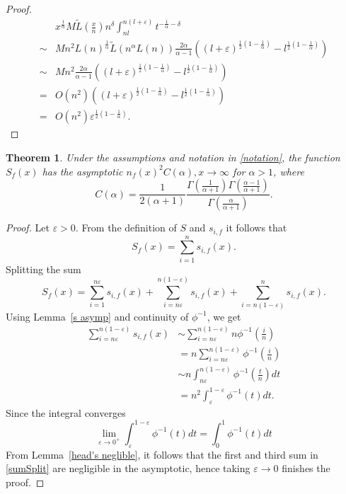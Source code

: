 \documentclass[10pt]{article}
\theoremstyle{plain}
\newtheorem{theorem}{Theorem}
\theoremstyle{definition}
\let\epsilon\varepsilon
\begin{document}
\begin{proof}
\begin{align}
			&x^{\frac{1}{\alpha}}M\tilde{L}\left(\frac{x}{n}\right)n^\delta\int_{nl}^{n(l+\epsilon)} t^{-\frac{1}{\alpha}-\delta}\\
			\sim &Mn^{2}L(n)^{\frac{1}{\alpha}}\tilde{L}(n^\alpha L(n))\frac{2\alpha}{\alpha-1}((l+\epsilon)^{\frac{1}{2}(1-\frac{1}{\alpha})}-l^{\frac{1}{2}(1-\frac{1}{\alpha})})\\
			\sim &Mn^{2}\frac{2\alpha}{\alpha-1}((l+\epsilon)^{\frac{1}{2}(1-\frac{1}{\alpha})}-l^{\frac{1}{2}(1-\frac{1}{\alpha})})\\
			=&O(n^2)((l+\epsilon)^{\frac{1}{2}(1-\frac{1}{\alpha})}-l^{\frac{1}{2}(1-\frac{1}{\alpha})})\\
			=&O(n^2)\epsilon^{\frac{1}{2}(1-\frac{1}{\alpha})}.
		\end{align}	
	\end{proof}
	
	
	
	
	
	
	\begin{theorem}\label{BlockSumsforAlphaGr1}
		Under the assumptions and notation in \ref{notation}, the function $S_f(x)$ has the asymptotic $n_f(x)^2 C(\alpha), x\to\infty$ for $\alpha>1$, where 
		\begin{equation}
			C(\alpha)=\frac{1}{2(\alpha+1)}
			\frac{\Gamma(\frac{1}{\alpha+1})\Gamma(\frac{\alpha-1}{\alpha+1})}{\Gamma(\frac{\alpha}{\alpha+1})}.
		\end{equation}
	\end{theorem}
	
	\begin{proof}
		Let $\epsilon>0$. From the definition of $S$ and $s_{i, f}$ it follows that
		\begin{equation}
			S_f(x)=\sum_{i=1}^{n} s_{i, f}(x).
		\end{equation}
		Splitting the sum
		\begin{equation}\label{sumSplit}
			S_f(x)=\sum_{i=1}^{n\epsilon} s_{i, f}(x)+\sum_{i=n\epsilon}^{n(1-\epsilon)} s_{i, f}(x)+\sum_{i=n(1-\epsilon)}^{n} s_{i, f}(x).
		\end{equation}
		Using Lemma~\ref{s asymp} and continuity of $\phi^{-1}$, we get
		\begin{align}
			\sum_{i=n\epsilon}^{n(1-\epsilon)} s_{i, f}(x)&\sim \sum_{i=n\epsilon}^{n(1-\epsilon)} n\phi^{-1}\left(\frac{i}{n}\right)\\
			&=n\sum_{i=n\epsilon}^{n(1-\epsilon)} \phi^{-1}\left(\frac{i}{n}\right)\\
			&\sim n \int_{n\epsilon}^{n(1-\epsilon)} \phi^{-1}\left(\frac{t}{n}\right)dt\\
			&=n^2\int_{\epsilon}^{1-\epsilon} \phi^{-1}(t)dt.
		\end{align}
		Since the integral converges
		\begin{equation}
			\lim_{\epsilon\to0^+} \int_{\epsilon}^{1-\epsilon} \phi^{-1}(t)dt =\int_{0}^{1} \phi^{-1}(t)dt
		\end{equation}
		From Lemma~\ref{head's neglible}, it follows that the first and third sum in \ref{sumSplit} are negligible in the asymptotic, hence taking $\epsilon\to 0$ finishes the proof. 
	\end{proof}
	
\end{document}
